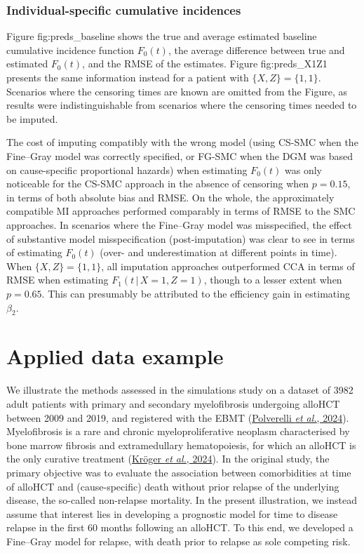 \documentclass[
  letterpaper,
  DIV=11,
  numbers=noendperiod]{scrreprt}
\newcommand{\given}{\,|\,}
\begin{document}
\hypertarget{individual-specific-cumulative-incidences}{%
\subsubsection{Individual-specific cumulative
incidences}\label{individual-specific-cumulative-incidences}}

Figure fig:preds\_baseline shows the true and average estimated baseline
cumulative incidence function \(F_0(t)\), the average difference between
true and estimated \(F_0(t)\), and the RMSE of the estimates. Figure
fig:preds\_X1Z1 presents the same information instead for a patient with
\(\{X, Z\} = \{1, 1\}\). Scenarios where the censoring times are known
are omitted from the Figure, as results were indistinguishable from
scenarios where the censoring times needed to be imputed.

The cost of imputing compatibly with the wrong model (using CS-SMC when
the Fine--Gray model was correctly specified, or FG-SMC when the DGM was
based on cause-specific proportional hazards) when estimating \(F_0(t)\)
was only noticeable for the CS-SMC approach in the absence of censoring
when \(p = 0.15\), in terms of both absolute bias and RMSE. On the
whole, the approximately compatible MI approaches performed comparably
in terms of RMSE to the SMC approaches. In scenarios where the
Fine--Gray model was misspecified, the effect of substantive model
misspecification (post-imputation) was clear to see in terms of
estimating \(F_0(t)\) (over- and underestimation at different points in
time). When \(\{X, Z\} = \{1, 1\}\), all imputation approaches
outperformed CCA in terms of RMSE when estimating
\(F_1(t \given X = 1, Z =1)\), though to a lesser extent when
\(p = 0.65\). This can presumably be attributed to the efficiency gain
in estimating \(\beta_2\).

\hypertarget{sec-polverelli}{%
\section{Applied data example}\label{sec-polverelli}}

We illustrate the methods assessed in the simulations study on a dataset
of 3982 adult patients with primary and secondary myelofibrosis
undergoing alloHCT between 2009 and 2019, and registered with the EBMT
(\protect\hyperlink{ref-polverelliImpactComorbiditiesBody2024a}{Polverelli
\emph{et al.}, 2024}). Myelofibrosis is a rare and chronic
myeloproliferative neoplasm characterised by bone marrow fibrosis and
extramedullary hematopoiesis, for which an alloHCT is the only curative
treatment
(\protect\hyperlink{ref-krogerIndicationManagementAllogeneic2024}{Kröger
\emph{et al.}, 2024}). In the original study, the primary objective was
to evaluate the association between comorbidities at time of alloHCT and
(cause-specific) death without prior relapse of the underlying disease,
the so-called non-relapse mortality. In the present illustration, we
instead assume that interest lies in developing a prognostic model for
time to disease relapse in the first 60 months following an alloHCT. To
this end, we developed a Fine--Gray model for relapse, with death prior
to relapse as sole competing risk.
\end{document}
